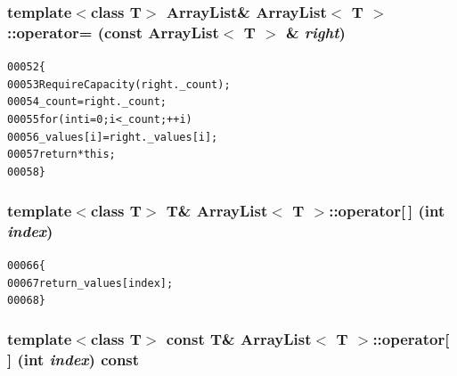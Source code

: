 \hypertarget{class_array_list_ae27782de18cb09f54fffba59f3f77d92}{
\subsubsection[{operator=}]{\setlength{\rightskip}{0pt plus 5cm}template$<$class T$>$ {\bf ArrayList}\& {\bf ArrayList}$<$ T $>$::operator= (const {\bf ArrayList}$<$ T $>$ \& {\em right})}}
\label{class_array_list_ae27782de18cb09f54fffba59f3f77d92}




\begin{footnotesize}\begin{alltt}
00052         \{
00053                 RequireCapacity(right.\_count);
00054                 \_count = right.\_count;
00055                 \textcolor{keywordflow}{for} (\textcolor{keywordtype}{int} i = 0; i < \_count; ++i)
00056                         \_values[i] = right.\_values[i];
00057                 \textcolor{keywordflow}{return} *\textcolor{keyword}{this};
00058         \}
\end{alltt}\end{footnotesize}


\hypertarget{class_array_list_aaf3e10ff2125cc396e3c5d357bf94f1e}{
\subsubsection[{operator[]}]{\setlength{\rightskip}{0pt plus 5cm}template$<$class T$>$ T\& {\bf ArrayList}$<$ T $>$::operator\mbox{[}$\,$\mbox{]} (int {\em index})}}
\label{class_array_list_aaf3e10ff2125cc396e3c5d357bf94f1e}




\begin{footnotesize}\begin{alltt}
00066         \{
00067                 \textcolor{keywordflow}{return} \_values[index];
00068         \}
\end{alltt}\end{footnotesize}


\hypertarget{class_array_list_a627f1cc60e0b9a85d869957a839bc064}{
\subsubsection[{operator[]}]{\setlength{\rightskip}{0pt plus 5cm}template$<$class T$>$ const T\& {\bf ArrayList}$<$ T $>$::operator\mbox{[}$\,$\mbox{]} (int {\em index}) const}}
\label{class_array_list_a627f1cc60e0b9a85d869957a839bc064}




